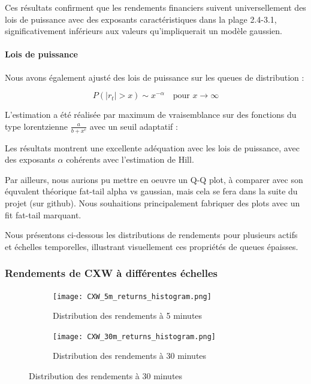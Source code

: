\documentclass[10pt,a4paper]{article}
\theoremstyle{definition}
\theoremstyle{remark}
\begin{document}
\begin{itemize}
Ces résultats confirment que les rendements financiers suivent universellement des lois de puissance avec des exposants caractéristiques dans la plage 2.4-3.1, significativement inférieurs aux valeurs qu'impliquerait un modèle gaussien.

\paragraph{Lois de puissance}
Nous avons également ajusté des lois de puissance sur les queues de distribution :

\begin{equation}
P(|r_t| > x) \sim x^{-\alpha} \quad \text{pour } x \to \infty
\end{equation}

L'estimation a été réalisée par maximum de vraisemblance sur des fonctions du type lorentzienne $\frac{a}{b+x^c}$ avec un seuil adaptatif :

Les résultats montrent une excellente adéquation avec les lois de puissance, avec des exposants $\alpha$ cohérents avec l'estimation de Hill.

Par ailleurs, nous aurions pu mettre en oeuvre un Q-Q plot, à comparer avec son équvalent théorique fat-tail alpha vs gaussian, mais cela se fera dans la suite du projet (sur github).
Nous souhaitions principalement fabriquer des plots avec un fit fat-tail marquant.

Nous présentons ci-dessous les distributions de rendements pour plusieurs actifs et échelles temporelles, illustrant visuellement ces propriétés de queues épaisses.

\subsubsection{Rendements de CXW à différentes échelles}

\begin{figure}[H]
    \centering
    \begin{subfigure}[b]{0.45\textwidth}
        \texttt{[image: CXW\_5m\_returns\_histogram.png]}
        \caption{Distribution des rendements à 5 minutes}
        \label{fig:CXW_5m_moved}
    \end{subfigure}
    \hfill
    \begin{subfigure}[b]{0.45\textwidth}
        \texttt{[image: CXW\_30m\_returns\_histogram.png]}
        \caption{Distribution des rendements à 30 minutes}
        \label{fig:CXW_30m_moved}
    \end{subfigure}
    

\end{figure}
\end{itemize}
\end{document}
